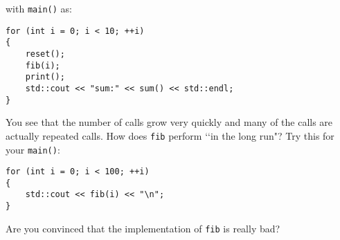 with \verb!main()! as:

\begin{Verbatim}[frame=single]
for (int i = 0; i < 10; ++i)
{
    reset();
    fib(i);
    print();
    std::cout << "sum:" << sum() << std::endl;
}
\end{Verbatim}

You see that the number of calls grow very quickly and many of the calls are
actually repeated calls.
How does \verb!fib! perform
\lq\lq in the long run"? Try this for your \verb!main()!:

\begin{Verbatim}[frame=single]
for (int i = 0; i < 100; ++i)
{
    std::cout << fib(i) << "\n";
}
\end{Verbatim}

Are you convinced that the implementation of \verb!fib! is really bad?


